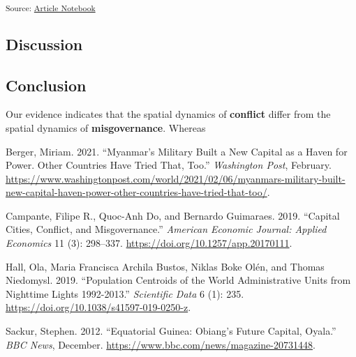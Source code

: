 \documentclass[
  letterpaper,
  DIV=11,
  numbers=noendperiod]{scrartcl}
\newlength{\cslhangindent}
\newenvironment{CSLReferences}[2] %
 {\begin{list}{}{%
  \setlength{\itemindent}{0pt}
  \setlength{\leftmargin}{0pt}
  \setlength{\parsep}{0pt}
  \ifodd #1
   \setlength{\leftmargin}{\cslhangindent}
   \setlength{\itemindent}{-1\cslhangindent}
  \fi
  \setlength{\itemsep}{#2\baselineskip}}}
 {\end{list}}
\begin{document}
\textsubscript{Source:
\href{https://bella20000605.github.io/gis_final_project/index.qmd.html}{Article
Notebook}}

\subsection{Discussion}\label{discussion}

\subsection{Conclusion}\label{conclusion}

Our evidence indicates that the spatial dynamics of \textbf{conflict}
differ from the spatial dynamics of \textbf{misgovernance}. Whereas

\label{refs}
\begin{CSLReferences}{1}{0}
Berger, Miriam. 2021. {``Myanmar's Military Built a New Capital as a
Haven for Power. {Other} Countries Have Tried That, Too.''}
\emph{Washington Post}, February.
\url{https://www.washingtonpost.com/world/2021/02/06/myanmars-military-built-new-capital-haven-power-other-countries-have-tried-that-too/}.

Campante, Filipe R., Quoc-Anh Do, and Bernardo Guimaraes. 2019.
{``Capital {Cities}, {Conflict}, and {Misgovernance}.''} \emph{American
Economic Journal: Applied Economics} 11 (3): 298--337.
\url{https://doi.org/10.1257/app.20170111}.

Hall, Ola, Maria Francisca Archila Bustos, Niklas Boke Olén, and Thomas
Niedomysl. 2019. {``Population Centroids of the World Administrative
Units from Nighttime Lights 1992-2013.''} \emph{Scientific Data} 6 (1):
235. \url{https://doi.org/10.1038/s41597-019-0250-z}.

Sackur, Stephen. 2012. {``Equatorial {Guinea}: {Obiang}'s Future
Capital, {Oyala}.''} \emph{BBC News}, December.
\url{https://www.bbc.com/news/magazine-20731448}.

\end{CSLReferences}
\end{document}
